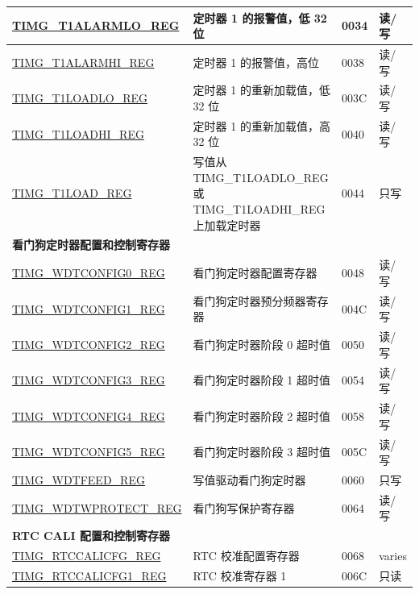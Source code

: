 \begin{longtable}{ | p{6cm} | p{7.2cm} | p{1.3cm} | p{1cm} | }
\hyperref[regdesc:TIMGTXALARMLOREG]{TIMG\_T1ALARMLO\_REG} & 定时器 1 的报警值，低 32 位 & \hexprefix{}0034 & 读/写 \\ \hline
\hyperref[regdesc:TIMGTXALARMHIREG]{TIMG\_T1ALARMHI\_REG} & 定时器 1 的报警值，高位 & \hexprefix{}0038 & 读/写 \\ \hline
\hyperref[regdesc:TIMGTXLOADLOREG]{TIMG\_T1LOADLO\_REG} & 定时器 1 的重新加载值，低 32 位 & \hexprefix{}003C & 读/写 \\ \hline
\hyperref[regdesc:TIMGTXLOADHIREG]{TIMG\_T1LOADHI\_REG} & 定时器 1 的重新加载值，高 32 位 & \hexprefix{}0040 & 读/写 \\ \hline
\hyperref[regdesc:TIMGTXLOADREG]{TIMG\_T1LOAD\_REG} & 写值从 TIMG\_T1LOADLO\_REG 或 TIMG\_T1LOADHI\_REG 上加载定时器 & \hexprefix{}0044 & 只写 \\ \hline
\multicolumn{4}{|l|}{\textbf{看门狗定时器配置和控制寄存器}} \\ \hline
\hyperref[regdesc:TIMGWDTCONFIG0REG]{TIMG\_WDTCONFIG0\_REG} & 看门狗定时器配置寄存器 & \hexprefix{}0048 & 读/写 \\ \hline
\hyperref[regdesc:TIMGWDTCONFIG1REG]{TIMG\_WDTCONFIG1\_REG} & 看门狗定时器预分频器寄存器 & \hexprefix{}004C & 读/写 \\ \hline
\hyperref[regdesc:TIMGWDTCONFIG2REG]{TIMG\_WDTCONFIG2\_REG} & 看门狗定时器阶段 0 超时值 & \hexprefix{}0050 & 读/写 \\ \hline
\hyperref[regdesc:TIMGWDTCONFIG3REG]{TIMG\_WDTCONFIG3\_REG} & 看门狗定时器阶段 1 超时值 & \hexprefix{}0054 & 读/写 \\ \hline
\hyperref[regdesc:TIMGWDTCONFIG4REG]{TIMG\_WDTCONFIG4\_REG} & 看门狗定时器阶段 2 超时值 & \hexprefix{}0058 & 读/写 \\ \hline
\hyperref[regdesc:TIMGWDTCONFIG5REG]{TIMG\_WDTCONFIG5\_REG} & 看门狗定时器阶段 3 超时值 & \hexprefix{}005C & 读/写 \\ \hline
\hyperref[regdesc:TIMGWDTFEEDREG]{TIMG\_WDTFEED\_REG} & 写值驱动看门狗定时器 & \hexprefix{}0060 & 只写 \\ \hline
\hyperref[regdesc:TIMGWDTWPROTECTREG]{TIMG\_WDTWPROTECT\_REG} & 看门狗写保护寄存器 & \hexprefix{}0064 & 读/写 \\ \hline
\multicolumn{4}{|l|}{\textbf{RTC CALI 配置和控制寄存器}} \\ \hline
\hyperref[regdesc:TIMGRTCCALICFGREG]{TIMG\_RTCCALICFG\_REG} & RTC 校准配置寄存器 & \hexprefix{}0068 & varies \\ \hline
\hyperref[regdesc:TIMGRTCCALICFG1REG]{TIMG\_RTCCALICFG1\_REG} & RTC 校准寄存器 1 & \hexprefix{}006C & 只读 \\ \hline

\end{longtable}
